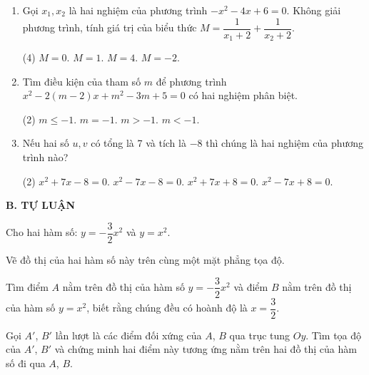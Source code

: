 \begin{practice}
\begin{enumerate}
        \item Gọi $x_1,x_2$ là hai nghiệm của phương trình $-x^2-4x+6=0$. Không giải phương trình, tính giá trị của biểu thức $M=\dfrac{1}{x_1+2}+\dfrac{1}{x_2+2}$.
        \begin{tasks}(4)
            \task[(A)] $M=0$.
            \task[(B)] $M=1$.
            \task[(C)] $M=4$.
            \task[(D)] $M=-2$.
        \end{tasks}
        \par\noindent\answerbox\par

        \item Tìm điều kiện của tham số $m$ để phương trình $x^2-2(m-2)x+m^2-3m+5=0$ có hai nghiệm phân biệt.
        \begin{tasks}(2)
            \task[(A)] $m\le -1$.
            \task[(B)] $m=-1$.
            \task[(C)] $m>-1$.
            \task[(D)] $m<-1$.
        \end{tasks}
        \par\noindent\answerbox\par

        \item Nếu hai số $u,v$ có tổng là 7 và tích là $-8$ thì chúng là hai nghiệm của phương trình nào?
        \begin{tasks}(2)
            \task[(A)] $x^2+7x-8=0$.
            \task[(B)] $x^2-7x-8=0$.
            \task[(C)] $x^2+7x+8=0$.
            \task[(D)] $x^2-7x+8=0$.
        \end{tasks}
        \par\noindent\answerbox\par
    \end{enumerate}

    \textbf{B. TỰ LUẬN}

    \begin{questions}[resume=SBT]
        \item Cho hai hàm số: $y=-\dfrac{3}{2}x^2$ và $y=x^2$.
        \begin{questions}
            \item Vẽ đồ thị của hai hàm số này trên cùng một mặt phẳng tọa độ.
            \item Tìm điểm $A$ nằm trên đồ thị của hàm số $y=-\dfrac{3}{2}x^2$ và điểm $B$ nằm trên đồ thị của hàm số $y=x^2$, biết rằng chúng đều có hoành độ là $x=\dfrac{3}{2}$.
            \item Gọi $A'$, $B'$ lần lượt là các điểm đối xứng của $A$, $B$ qua trục tung $Oy$. Tìm tọa độ của $A'$, $B'$ và chứng minh hai điểm này tương ứng nằm trên hai đồ thị của hàm số đi qua $A$, $B$.
        \end{questions}


\end{questions}
\end{practice}
